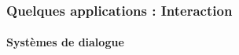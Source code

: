 \documentclass[xcolor=table]{beamer}
\begin{document}
\begin{frame}
	\frametitle{Quelques applications : Interaction}
	\framesubtitle{Systèmes de dialogue}
\end{frame}
\end{document}
